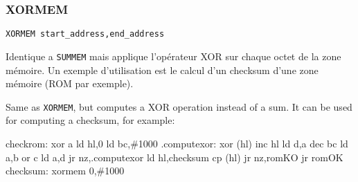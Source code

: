 \subsubsection{XORMEM}
\begin{verbatim}
XORMEM start_address,end_address
\end{verbatim}

\begin{xfr}
  Identique a \texttt{SUMMEM} mais applique l'opérateur XOR sur chaque octet de la zone mémoire.
  Un exemple d'utilisation est le calcul d'un checksum d'une zone mémoire (ROM par exemple).
\end{xfr}

\begin{xen}
Same as \texttt{XORMEM}, but computes a XOR operation instead of a sum.
It can be used for computing a checksum, for example:
\end{xen}


\begin{code}
checkrom:
  xor a
  ld hl,0
  ld bc,\#1000
.computexor:
  xor (hl)
  inc hl
  ld d,a
  dec bc
  ld a,b
  or c
  ld a,d
  jr nz,.computexor
  ld hl,checksum
  cp (hl)
  jr nz,romKO
  jr romOK
checksum:
   xormem 0,\#1000
\end{code}
